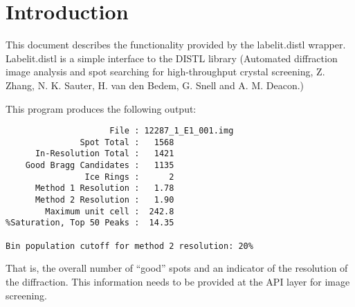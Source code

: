 \documentclass[a4paper, 11pt]{article}
\begin{document}
\section{Introduction}
This document describes the functionality provided by the labelit.distl
wrapper. Labelit.distl is a simple interface to the DISTL library 
(Automated diffraction image analysis and spot searching for 
high-throughput crystal screening, Z. Zhang, N. K. Sauter, 
H. van den Bedem, G. Snell and A. M. Deacon.)

This program produces the following output:

{
\tiny
\begin{verbatim}
                     File : 12287_1_E1_001.img
               Spot Total :   1568
      In-Resolution Total :   1421
    Good Bragg Candidates :   1135
                Ice Rings :      2
      Method 1 Resolution :   1.78
      Method 2 Resolution :   1.90
        Maximum unit cell :  242.8
%Saturation, Top 50 Peaks :  14.35

Bin population cutoff for method 2 resolution: 20%
\end{verbatim}
}

That is, the overall number of ``good'' spots and an indicator of the
resolution of the diffraction. This information needs to be provided at
the API layer for image screening.
\end{document}
